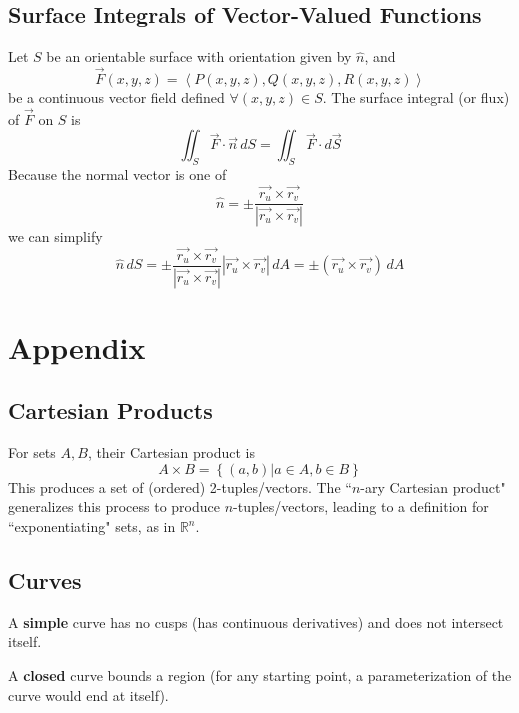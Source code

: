 \documentclass{article}
\newcommand{\vect}[1]{\ensuremath{\overrightarrow{#1}}}
\begin{document}
\subsection{Surface Integrals of Vector-Valued Functions}
Let $S$ be an orientable surface with orientation given by $\hat{n}$, and $$\vect{F}(x,y,z)=\left\langle P(x,y,z),Q(x,y,z),R(x,y,z)\right\rangle$$ be a continuous vector field defined $\forall (x,y,z)\in S$. The surface integral (or flux) of $\vect{F}$ on $S$ is
$$\iint_S\vect{F}\cdot\vect{n}\,dS=\iint_S\vect{F}\cdot d\vect{S}$$
Because the normal vector is one of
$$\hat{n}=\pm\frac{\vect{r_u}\times\vect{r_v}}{\left|\vect{r_u}\times\vect{r_v}\right|}$$
we can simplify
$$\hat{n}\,dS=\pm\frac{\vect{r_u}\times\vect{r_v}}{\left|\vect{r_u}\times\vect{r_v}\right|}\left|\vect{r_u}\times\vect{r_v}\right|\,dA=\pm\left(\vect{r_u}\times\vect{r_v}\right)\,dA$$

\section{Appendix}
\subsection{Cartesian Products} \label{set-multiplication}
For sets $A, B$, their Cartesian product is $$A \times B = \left\{ (a,b) | a \in A, b \in B\right\}$$
This produces a set of (ordered) 2-tuples/vectors.
The ``$n$-ary Cartesian product" generalizes this process to produce $n$-tuples/vectors, leading to a definition for ``exponentiating" sets, as in $\mathbb{R}^n$.

\subsection{Curves}
A \textbf{simple} curve has no cusps (has continuous derivatives) and does not intersect itself.

A \textbf{closed} curve bounds a region (for any starting point, a parameterization of the curve would end at itself).
\end{document}
